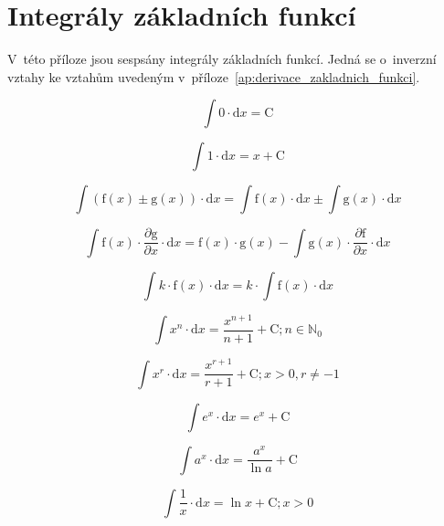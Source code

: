 \chapter{Integrály základních funkcí}
\label{ap:integraly_zakladnich_funkci}

V~této příloze jsou sespsány integrály základních funkcí. Jedná se o~inverzní vztahy ke vztahům uvedeným v~příloze~\ref{ap:derivace_zakladnich_funkci}.

\begin{equation}
\int 0 \cdot \mathrm{d}x = \mathrm{C}
\end{equation}

\begin{equation}
\int 1 \cdot \mathrm{d}x = x + \mathrm{C}
\end{equation}

\begin{equation}
\int (\mathrm{f}(x) \pm \mathrm{g}(x)) \cdot \mathrm{d}x = \int \mathrm{f}(x) \cdot \mathrm{d}x \pm \int \mathrm{g}(x) \cdot \mathrm{d}x
\end{equation}

\begin{equation}
\int \mathrm{f}(x) \cdot \frac{\partial \mathrm{g}}{\partial x} \cdot \mathrm{d}x = \mathrm{f}(x) \cdot \mathrm{g}(x) - \int \mathrm{g}(x) \cdot \frac{\partial \mathrm{f}}{\partial x} \cdot \mathrm{d}x
\end{equation}

\begin{equation}
\int k \cdot \mathrm{f}(x) \cdot \mathrm{d}x = k \cdot \int \mathrm{f}(x) \cdot \mathrm{d}x
\end{equation}

\begin{equation}
\int x^n \cdot \mathrm{d}x = \frac{x^{n + 1}}{n + 1} + \mathrm{C}; n \in \mathbb{N}_0
\end{equation}

\begin{equation}
\int x^r \cdot \mathrm{d}x = \frac{x^{r + 1}}{r + 1} + \mathrm{C}; x > 0, r \neq -1
\end{equation}

\begin{equation}
\int e^x \cdot \mathrm{d}x = e^x + \mathrm{C}
\end{equation}

\begin{equation}
\int a^x \cdot \mathrm{d}x = \frac{a^x}{\ln a} + \mathrm{C}
\end{equation}

\begin{equation}
\int \frac{1}{x} \cdot \mathrm{d}x = \ln x  + \mathrm{C}; x > 0
\end{equation}
